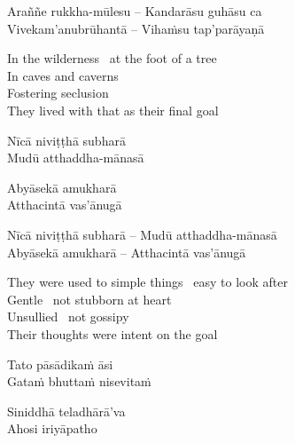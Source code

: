 \else

\begin{verses}
  Araññe rukkha-mūlesu – Kandarāsu guhāsu ca\\
  Vivekam'anubrūhantā – Vihaṁsu tap'parāyaṇā
\end{verses}

\fi

\ifninebythirteen\clearpage\fi

\begin{english-verses}
  In the wilderness \breathmark\ at the foot of a tree\\
  In caves and caverns\\
  Fostering seclusion\\
  They lived with that as their final goal
\end{english-verses}

\ifninebythirteen

\begin{pali-hang-verses}
  Nīcā niviṭṭhā subharā\\
  Mudū atthaddha-mānasā\\
\end{pali-hang-verses}
\begin{pali-hang-together}
  Abyāsekā amukharā\\
  Atthacintā vas'ānugā
\end{pali-hang-together}

\else

\begin{verses}
  Nīcā niviṭṭhā subharā – Mudū atthaddha-mānasā\\
  Abyāsekā amukharā – Atthacintā vas'ānugā
\end{verses}

\fi

\begin{english-verses}
  They were used to simple things \breathmark\ easy to look after\\
  Gentle \breathmark\ not stubborn at heart\\
  Unsullied \breathmark\ not gossipy\\
  Their thoughts were intent on the goal
\end{english-verses}

\ifninebythirteen

\begin{pali-hang-verses}
  Tato pāsādikaṁ āsi\\
  Gataṁ bhuttaṁ nisevitaṁ
\end{pali-hang-verses}
\begin{pali-hang-together}
  Siniddhā teladhārā'va\\
  Ahosi iriyāpatho
\end{pali-hang-together}

